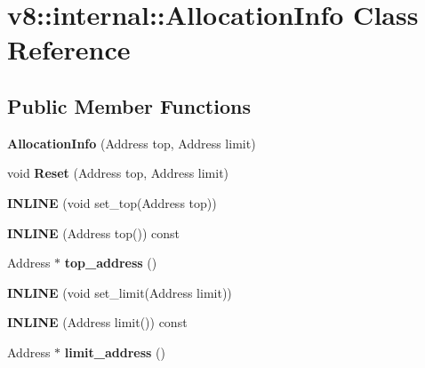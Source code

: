 \hypertarget{classv8_1_1internal_1_1_allocation_info}{}\section{v8\+:\+:internal\+:\+:Allocation\+Info Class Reference}
\label{classv8_1_1internal_1_1_allocation_info}
\subsection*{Public Member Functions}
\begin{DoxyCompactItemize}
\item 
{\bfseries Allocation\+Info} (Address top, Address limit)\hypertarget{classv8_1_1internal_1_1_allocation_info_a97a9e451a9be15f1e24f5c4b240443f7}{}\label{classv8_1_1internal_1_1_allocation_info_a97a9e451a9be15f1e24f5c4b240443f7}

\item 
void {\bfseries Reset} (Address top, Address limit)\hypertarget{classv8_1_1internal_1_1_allocation_info_aef663a7e9109d1760e2028bce25ba6b8}{}\label{classv8_1_1internal_1_1_allocation_info_aef663a7e9109d1760e2028bce25ba6b8}

\item 
{\bfseries I\+N\+L\+I\+NE} (void set\+\_\+top(Address top))\hypertarget{classv8_1_1internal_1_1_allocation_info_af8f9686e08052a9e066add347241077f}{}\label{classv8_1_1internal_1_1_allocation_info_af8f9686e08052a9e066add347241077f}

\item 
{\bfseries I\+N\+L\+I\+NE} (Address top()) const \hypertarget{classv8_1_1internal_1_1_allocation_info_aa897b4df37d75634898fa85fb8d5e809}{}\label{classv8_1_1internal_1_1_allocation_info_aa897b4df37d75634898fa85fb8d5e809}

\item 
Address $\ast$ {\bfseries top\+\_\+address} ()\hypertarget{classv8_1_1internal_1_1_allocation_info_a897145eaa96721ed52c65092c197457f}{}\label{classv8_1_1internal_1_1_allocation_info_a897145eaa96721ed52c65092c197457f}

\item 
{\bfseries I\+N\+L\+I\+NE} (void set\+\_\+limit(Address limit))\hypertarget{classv8_1_1internal_1_1_allocation_info_a35b76f68233e807ec468ed3e7aa0deeb}{}\label{classv8_1_1internal_1_1_allocation_info_a35b76f68233e807ec468ed3e7aa0deeb}

\item 
{\bfseries I\+N\+L\+I\+NE} (Address limit()) const \hypertarget{classv8_1_1internal_1_1_allocation_info_a69e969e80f07b3878c74cc5eebb4ccbb}{}\label{classv8_1_1internal_1_1_allocation_info_a69e969e80f07b3878c74cc5eebb4ccbb}

\item 
Address $\ast$ {\bfseries limit\+\_\+address} ()\hypertarget{classv8_1_1internal_1_1_allocation_info_aed8145b18c14b88152d715424f0056fa}{}\label{classv8_1_1internal_1_1_allocation_info_aed8145b18c14b88152d715424f0056fa}

\end{DoxyCompactItemize}
